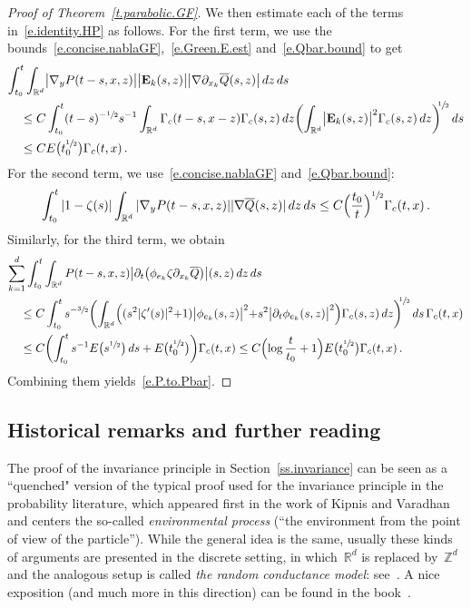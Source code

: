\documentclass[11pt]{article} %
\numberwithin{equation}{section}
\theoremstyle{definition}
\newcommand*{\R}{\ensuremath{\mathbb{R}}}
\newcommand*{\Zd}{\ensuremath{\mathbb{Z}^d}}
\newcommand*{\Rd}{\ensuremath{\mathbb{R}^d}}
\begin{document}
\begin{proof}[{Proof of Theorem~\ref{t.parabolic.GF}}]
We then estimate each of the terms in~\eqref{e.identity.HP} as follows. For the first term, we use the bounds~\eqref{e.concise.nablaGF},~\eqref{e.Green.E.est} and~\eqref{e.Qbar.bound} to get
\begin{align*}
\lefteqn{
\int_{t_0}^{t}
\int_{\Rd} 
\bigl| \nabla_y P(t-s,x,z) \bigr|
\bigl|\mathbf{E}_k(s,z) \bigr| \bigl|  \nabla \partial_{x_k} \overline{Q} (s,z) \bigr| 
\,dz\,ds
} \quad & 
\\ & 
\leq
C
\int_{t_0}^{t} (t-s)^{-\sfrac12}  s^{-1} \int_{\R^d}  \Gamma_c(t-s,x-z)    \Gamma_c(s,z) \,dz
\biggl( 
\int_{\Rd} 
\bigl|\mathbf{E}_k(s,z) \bigr|^2 
\Gamma_c(s,z)
\,dz 
\biggr)^{\!\!\sfrac12 }
 \, ds
\notag \\ & 
\leq
C E\bigl(t_0^{\sfrac12}\bigr) 
\Gamma_c(t,x)  
\,.
\end{align*}
For the second term, we use~\eqref{e.concise.nablaGF} and~\eqref{e.Qbar.bound}:
\begin{equation*}
\int_{t_0}^{t}
|1-\zeta(s)|
\int_{\Rd} 
| \nabla_y P(t-s,x,z) | 
| \nabla\overline{Q}(s,z)| 
\,dz\,ds
\leq
C \Bigl( \frac{t_0}{t} \Bigr)^{\sfrac12} 
\Gamma_c (t,x)\,.
\end{equation*}
Similarly, for the third term, we obtain 
\begin{align*}
\lefteqn{
\sum_{k=1}^d
\int_{t_0}^{t}
\int_{\Rd}
P(t-s,x,z) \bigl| \partial_t \bigl( \phi_{e_k} \zeta \partial_{x_k}  \overline{Q}\bigr)\bigr| (s,z)
\,dz\,ds
} \quad & 
\\ & 
\leq
C
\int_{t_0}^{t}
s^{-\sfrac 32}
\biggl( 
\int_{\Rd} 
\Bigl( (  s^2 |\zeta'(s)|^2 {+} 1) \bigl|\phi_{e_k}(s,z) \bigr|^2  {+} s^2 \bigl| \partial_t \phi_{e_k}(s,z) \bigr|^2 \Bigr)
\Gamma_c(s,z)
\,dz
\biggr)^{\!\!\sfrac12 }   
\, ds \,
\Gamma_c(t,x) 
\notag \\ & 
\leq 
C  \biggl(  \int_{t_0}^{t} s^{-1}  E\bigl(s^{\sfrac12}\bigr)  \, ds + E\bigl(t_0^{\sfrac12}\bigr)  \biggr) \Gamma_c(t,x) 
\leq 
C \Bigl( \log \frac{t}{t_0} + 1 \Bigr)
E\bigl(t_0^{\sfrac12}\bigr) 
\Gamma_c(t,x) 
\,.
\end{align*}
Combining them yields~\eqref{e.P.to.Pbar}.
\end{proof}

\subsection*{Historical remarks and further reading}

The proof of the invariance principle in Section~\ref{ss.invariance} can be seen as a ``quenched" version of the typical proof used for the invariance principle in the probability literature, which appeared first in the work of Kipnis and Varadhan~\cite{KV} and centers the so-called \emph{environmental process} (``the environment from the point of view of the particle''). 
While the general idea is the same, usually these kinds of arguments are presented in the discrete setting, in which~$\Rd$ is replaced by~$\Zd$ and the analogous setup is called \emph{the random conductance model}: see~\cite{Biskup,EGMN}. 
A nice exposition (and much more in this direction) can be found in the book~\cite{KLO}. 
\end{document}
